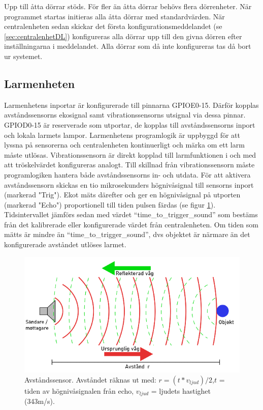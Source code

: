 Upp till åtta dörrar stöds. För fler än åtta dörrar behövs flera dörrenheter. När programmet startas initieras alla åtta dörrar med standardvärden. När centralenheten sedan skickar det första konfigurationsmeddelandet (se \ref{sec:centralenhetDL}) konfigureras alla dörrar upp till den givna dörren efter inställningarna i meddelandet. Alla dörrar som då inte konfigureras tas då bort ur systemet.
\subsection{Larmenheten}
\label{sec:larmenhet}
Larmenhetens inportar är konfigurerade till pinnarna GPIOE0-15. Därför kopplas avståndssensorns ekosignal samt vibrationssensorns utsignal via dessa pinnar. GPIOD0-15 är reserverade som utportar, de kopplas till avståndssensorns inport och lokala larmets lampor.
\newline\newline
Larmenhetens programlogik är uppbyggd för att lyssna på sensorerna och centralenheten kontinuerligt och märka om ett larm måste utlösas. Vibrationssensorn är direkt kopplad till larmfunktionen i och med att tröskelvärdet  konfigureras analogt. Till skillnad från vibrationssensorn måste programlogiken hantera både avståndssensorns in- och utdata. För att aktivera avståndssensorn skickas en tio mikrosekunders högnivåsignal till sensorns inport  (markerad "Trig"). Ekot mäts därefter och ger en högnivåsignal på utporten (markerad "Echo") proportionell till tiden pulsen färdas (se figur \ref{fig:Sonar}). Tidsintervallet jämförs sedan med värdet “time\_to\_trigger\_sound” som bestäms från det kalibrerade eller konfigurerade värdet från centralenheten. Om tiden som mätts är mindre än “time\_to\_trigger\_sound”, dvs objektet är närmare än det konfigurerade avståndet utlöses larmet.
\begin{figure}[h]
    \centering
    \includegraphics[scale=0.58]{dokumentation/projektrapport/IMAGES/Sonar.png}
    \caption{Avståndssensor. Avståndet räknas ut med: $r = (t * v_{ljud}) / 2$,\newline $t$ = tiden av högnivåsignalen från echo, $v_{ljud}$ = ljudets hastighet (343m/s).}
    \label{fig:Sonar}
\end{figure}
